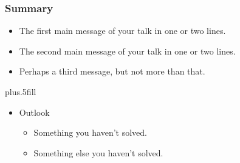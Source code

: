 \documentclass{beamer}
\begin{document}
\begin{frame}
  \frametitle<presentation>{Summary}

  \begin{itemize}
  \item
    The \alert{first main message} of your talk in one or two lines.
  \item
    The \alert{second main message} of your talk in one or two lines.
  \item
    Perhaps a \alert{third message}, but not more than that.
  \end{itemize}

  \vskip0pt plus.5fill
  \begin{itemize}
  \item
    Outlook
    \begin{itemize}
    \item
      Something you haven't solved.
    \item
      Something else you haven't solved.
    \end{itemize}
  \end{itemize}
\end{frame}
\end{document}
